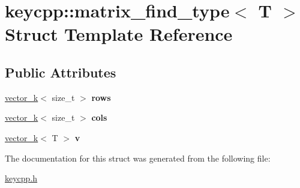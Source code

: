 \hypertarget{structkeycpp_1_1matrix__find__type}{\section{keycpp\-:\-:matrix\-\_\-find\-\_\-type$<$ T $>$ Struct Template Reference}
\label{structkeycpp_1_1matrix__find__type}
}
\subsection*{Public Attributes}
\begin{DoxyCompactItemize}
\item 
\hypertarget{structkeycpp_1_1matrix__find__type_aa24c1aaa15157e73257d21d4b1602476}{\hyperlink{classkeycpp_1_1vector__k}{vector\-\_\-k}$<$ size\-\_\-t $>$ {\bfseries rows}}\label{structkeycpp_1_1matrix__find__type_aa24c1aaa15157e73257d21d4b1602476}

\item 
\hypertarget{structkeycpp_1_1matrix__find__type_a86829d2b406e6879e4e0af71678beea6}{\hyperlink{classkeycpp_1_1vector__k}{vector\-\_\-k}$<$ size\-\_\-t $>$ {\bfseries cols}}\label{structkeycpp_1_1matrix__find__type_a86829d2b406e6879e4e0af71678beea6}

\item 
\hypertarget{structkeycpp_1_1matrix__find__type_afa61a4c5c45be1ce35a4c35e5c71ff66}{\hyperlink{classkeycpp_1_1vector__k}{vector\-\_\-k}$<$ T $>$ {\bfseries v}}\label{structkeycpp_1_1matrix__find__type_afa61a4c5c45be1ce35a4c35e5c71ff66}

\end{DoxyCompactItemize}


The documentation for this struct was generated from the following file\-:\begin{DoxyCompactItemize}
\item 
\hyperlink{keycpp_8h}{keycpp.\-h}\end{DoxyCompactItemize}
